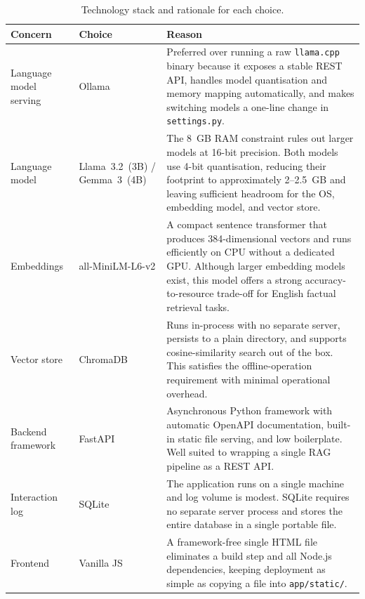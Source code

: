\begin{table}[H]
\centering
\begin{tabular}{| m{} | m{} | m{} |}
\hline
\textbf{Concern} & \textbf{Choice} & \textbf{Reason} \\
\hline
Language model serving & Ollama &
    Preferred over running a raw \texttt{llama.cpp} binary because it exposes a
    stable REST API, handles model quantisation and memory mapping automatically,
    and makes switching models a one-line change in \texttt{settings.py}. \\
\hline
Language model & Llama~3.2~(3B) / Gemma~3~(4B) &
    The 8~GB RAM constraint rules out larger models at 16-bit precision.
    Both models use 4-bit quantisation, reducing their footprint to
    approximately 2--2.5~GB and leaving sufficient headroom for the OS,
    embedding model, and vector store. \\
\hline
Embeddings & all-MiniLM-L6-v2 &
    A compact sentence transformer that produces 384-dimensional vectors and
    runs efficiently on CPU without a dedicated GPU. Although larger embedding
    models exist, this model offers a strong accuracy-to-resource trade-off
    for English factual retrieval tasks. \\
\hline
Vector store & ChromaDB &
    Runs in-process with no separate server, persists to a plain directory,
    and supports cosine-similarity search out of the box. This satisfies the
    offline-operation requirement with minimal operational overhead. \\
\hline
Backend framework & FastAPI &
    Asynchronous Python framework with automatic OpenAPI documentation,
    built-in static file serving, and low boilerplate. Well suited to
    wrapping a single RAG pipeline as a REST API. \\
\hline
Interaction log & SQLite &
    The application runs on a single machine and log volume is modest.
    SQLite requires no separate server process and stores the entire
    database in a single portable file. \\
\hline
Frontend & Vanilla JS &
    A framework-free single HTML file eliminates a build step and all
    Node.js dependencies, keeping deployment as simple as copying a file
    into \texttt{app/static/}. \\
\hline
\end{tabular}
\caption{Technology stack and rationale for each choice.}
\label{tab:stack}
\end{table}

